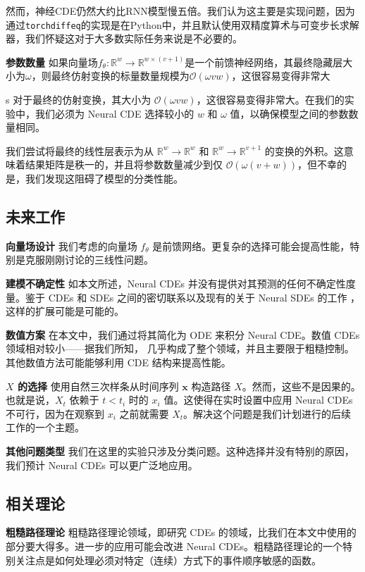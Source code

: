 \documentclass{ctexart}
\theoremstyle{plain}
\theoremstyle{definition}
\newcommand{\reals}{\mathbb{R}}
\newcommand{\bigO}{\mathcal{O}}
\newcommand{\boldheading}[1]{

\textbf{#1}\quad}
\begin{document}
\begin{rations}
	然而，神经CDE仍然大约比RNN模型慢五倍。我们认为这主要是实现问题，因为通过\texttt{torchdiffeq}的实现是在Python中，并且默认使用双精度算术与可变步长求解器，我们怀疑这对于大多数实际任务来说是不必要的。
	
	\boldheading{参数数量}
	如果向量场$f_\theta \colon \reals^w \to \reals^{w \times (v + 1)}$是一个前馈神经网络，其最终隐藏层大小为$\omega$，则最终仿射变换的标量数量规模为$\bigO(\omega v w)$，这很容易变得非常大
\end{rations}s 对于最终的仿射变换，其大小为 $\bigO(\omega v w)$，这很容易变得非常大。在我们的实验中，我们必须为 Neural CDE 选择较小的 $w$ 和 $\omega$ 值，以确保模型之间的参数数量相同。
	
	我们尝试将最终的线性层表示为从 $\reals^w \to \reals^w$ 和 $\reals^w \to \reals^{v + 1}$ 的变换的外积。这意味着结果矩阵是秩一的，并且将参数数量减少到仅 $\bigO(\omega (v + w))$，但不幸的是，我们发现这阻碍了模型的分类性能。
	
	\subsection{未来工作}	
	\boldheading{向量场设计}
	我们考虑的向量场 $f_\theta$ 是前馈网络。更复杂的选择可能会提高性能，特别是克服刚刚讨论的三线性问题。
	
	\boldheading{建模不确定性}
	如本文所述，Neural CDEs 并没有提供对其预测的任何不确定性度量。鉴于 CDEs 和 SDEs 之间的密切联系以及现有的关于 Neural SDEs 的工作 \cite{josef, nsde-generative, stochasticDNF, nsde-normalisation, stochasticnode, scalable-sde, nsde-basic, roughstochasticNF, imanol2020sde}，这样的扩展可能是可能的。
	
	\boldheading{数值方案}
	在本文中，我们通过将其简化为 ODE 来积分 Neural CDE。数值 CDEs 领域相对较小——据我们所知，\cite{lyons2014rough, logode1, logode2, gyurkothesis, arendthesis, dimensionfree, yang2015roughtaylor, jamesthesis, foster2020odemethod} 几乎构成了整个领域，并且主要限于粗糙控制。其他数值方法可能能够利用 CDE 结构来提高性能。
	
	\boldheading{$X$ 的选择} 使用自然三次样条从时间序列 $\mathbf{x}$ 构造路径 $X$。然而，这些不是因果的。也就是说，$X_t$ 依赖于 $t < t_i$ 时的 $x_i$ 值。这使得在实时设置中应用 Neural CDEs 不可行，因为在观察到 $x_i$ 之前就需要 $X_t$。解决这个问题是我们计划进行的后续工作的一个主题。
	
	\boldheading{其他问题类型}
	我们在这里的实验只涉及分类问题。这种选择并没有特别的原因，我们预计 Neural CDEs 可以更广泛地应用。
	
	\subsection{相关理论}	
	\boldheading{粗糙路径理论}
	粗糙路径理论领域，即研究 CDEs 的领域，比我们在本文中使用的部分要大得多。进一步的应用可能会改进 Neural CDEs。粗糙路径理论的一个特别关注点是如何处理必须对特定（连续）方式下的事件顺序敏感的函数。
	
\end{document}
